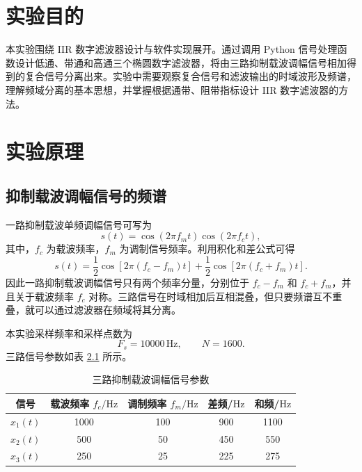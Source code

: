 \documentclass[bachelor,ktreport,openany,oneside,AutoFakeBold=true]{buaathesis}
\newcommand{\Hz}{\mathrm{Hz}}
\begin{document}
\tableofcontents
\cleardoublepage
{}
{}
\listoffigures
\cleardoublepage
{}
{}
\listoftables

\mainmatter
\pagestyle{mainmatter}

\chapter{实验目的}

本实验围绕 IIR 数字滤波器设计与软件实现展开。通过调用 Python 信号处理函数设计低通、带通和高通三个椭圆数字滤波器，将由三路抑制载波调幅信号相加得到的复合信号分离出来。实验中需要观察复合信号和滤波输出的时域波形及频谱，理解频域分离的基本思想，并掌握根据通带、阻带指标设计 IIR 数字滤波器的方法。

\chapter{实验原理}

\section{抑制载波调幅信号的频谱}

一路抑制载波单频调幅信号可写为
\begin{equation}
s(t)=\cos(2\pi f_m t)\cos(2\pi f_c t),
\end{equation}
其中，\(f_c\) 为载波频率，\(f_m\) 为调制信号频率。利用积化和差公式可得
\begin{equation}
s(t)=\frac{1}{2}\cos\left[2\pi(f_c-f_m)t\right]
    +\frac{1}{2}\cos\left[2\pi(f_c+f_m)t\right].
\end{equation}
因此一路抑制载波调幅信号只有两个频率分量，分别位于 \(f_c-f_m\) 和 \(f_c+f_m\)，并且关于载波频率 \(f_c\) 对称。三路信号在时域相加后互相混叠，但只要频谱互不重叠，就可以通过滤波器在频域将其分离。

本实验采样频率和采样点数为
\begin{equation}
F_s=10000\,\Hz,\qquad N=1600.
\end{equation}
三路信号参数如表 \ref{tab:signal-param} 所示。

\begin{table}[H]
\centering
\caption{三路抑制载波调幅信号参数}
\label{tab:signal-param}
\begin{tabular}{ccccc}
\toprule
信号 & 载波频率 \(f_c/\Hz\) & 调制频率 \(f_m/\Hz\) & 差频/\(\Hz\) & 和频/\(\Hz\)\\
\midrule
\(x_1(t)\) & 1000 & 100 & 900 & 1100\\
\(x_2(t)\) & 500 & 50 & 450 & 550\\
\(x_3(t)\) & 250 & 25 & 225 & 275\\
\bottomrule
\end{tabular}
\end{table}
\end{document}
